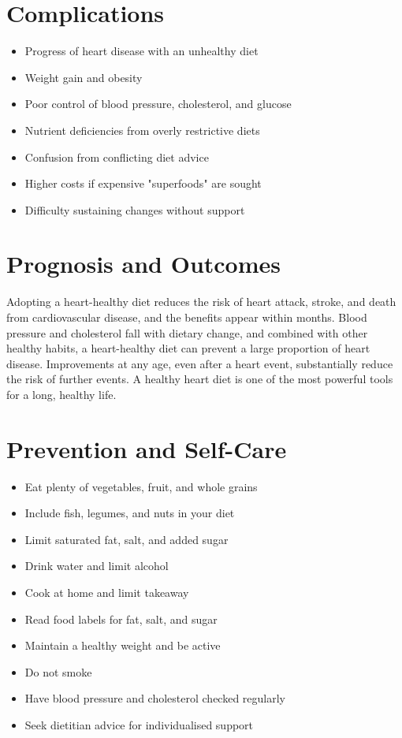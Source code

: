 \section*{Complications}
\begin{itemize}
    \item Progress of heart disease with an unhealthy diet
    \item Weight gain and obesity
    \item Poor control of blood pressure, cholesterol, and glucose
    \item Nutrient deficiencies from overly restrictive diets
    \item Confusion from conflicting diet advice
    \item Higher costs if expensive "superfoods" are sought
    \item Difficulty sustaining changes without support
\end{itemize}

\section*{Prognosis and Outcomes}
Adopting a heart-healthy diet reduces the risk of heart attack, stroke, and death from cardiovascular disease, and the benefits appear within months. Blood pressure and cholesterol fall with dietary change, and combined with other healthy habits, a heart-healthy diet can prevent a large proportion of heart disease. Improvements at any age, even after a heart event, substantially reduce the risk of further events. A healthy heart diet is one of the most powerful tools for a long, healthy life.

\section*{Prevention and Self-Care}
\begin{itemize}
    \item Eat plenty of vegetables, fruit, and whole grains
    \item Include fish, legumes, and nuts in your diet
    \item Limit saturated fat, salt, and added sugar
    \item Drink water and limit alcohol
    \item Cook at home and limit takeaway
    \item Read food labels for fat, salt, and sugar
    \item Maintain a healthy weight and be active
    \item Do not smoke
    \item Have blood pressure and cholesterol checked regularly
    \item Seek dietitian advice for individualised support
\end{itemize}

